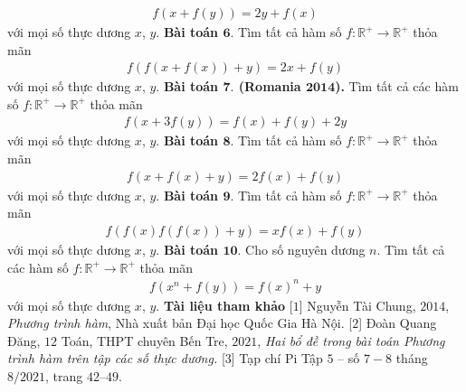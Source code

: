 \begin{multicols}{2}
	\begin{align*}
		f(x+f(y))=2 y+f(x)
	\end{align*}
	với mọi số thực dương $x$, $y$.
	\vskip 0.1cm
	\textbf{\color{hoccungpi}Bài toán $\pmb{6.}$}
	Tìm tất cả hàm số $f: \mathbb{R}^{+} \rightarrow \mathbb{R}^{+}$ thỏa mãn
	\begin{align*}
			f(f(x+f(x))+y)=2 x+f(y)
	\end{align*}
	với mọi số thực dương $x$, $y$.
	\textbf{\color{hoccungpi}Bài toán $\pmb{7.}$ (Romania $\pmb{2014}$).}
	Tìm tất cả các hàm số $f: \mathbb{R}^{+} \rightarrow \mathbb{R}^{+}$ thỏa mãn
	\begin{align*}
		f(x+3 f(y))=f(x)+f(y)+2 y 
	\end{align*}
	với mọi số thực dương $x$, $y$.
	\vskip 0.1cm
	\textbf{\color{hoccungpi}Bài toán $\pmb{8.}$}	Tìm tất cả hàm số $f: \mathbb{R}^{+} \rightarrow \mathbb{R}^{+}$ thỏa mãn
	\begin{align*}
		f(x+f(x)+y)=2 f(x)+f(y) 
	\end{align*}	
	với mọi số thực dương $x$, $y$.
	\vskip 0.1cm
	\textbf{\color{hoccungpi}Bài toán $\pmb{9.}$}
	Tìm tất cả hàm số $f: \mathbb{R}^{+} \rightarrow \mathbb{R}^{+}$ thỏa mãn
	\begin{align*}
		f(f(x) f(f(x))+y)=x f(x)+f(y)
	\end{align*}
		với mọi số thực dương $x$, $y$.
	\vskip 0.1cm
	\textbf{\color{hoccungpi}Bài toán $\pmb{10.}$}
	Cho số nguyên dương $n$.
	Tìm tất cả các hàm số $f:\mathbb{R}^{+}  \to \mathbb{R}^{+} $ thỏa mãn 
	\begin{align*}
		f\left( {{x^n} + f(y)} \right) = f(x)^n + y
	\end{align*}
	với mọi số thực dương $x$, $y$.
	\vskip 0.1cm	
	\textbf{\color{hoccungpi}Tài liệu tham khảo}
	\vskip 0.1cm
	[$1$] Nguyễn Tài Chung, $2014$, {\it Phương trình hàm}, {Nhà xuất bản Đại học Quốc Gia Hà Nội.}
	\vskip 0.1cm
	[$2$] Đoàn Quang Đăng, $12$ Toán, THPT chuyên Bến Tre, $2021$,
	{\it Hai bổ đề trong bài toán Phương trình hàm trên tập các số thực dương.}
	\vskip 0.1cm
	[$3$] Tạp chí Pi Tập $5$ -- số $7-8$ tháng $8/2021$,  trang $42$--$49$.
\end{multicols}